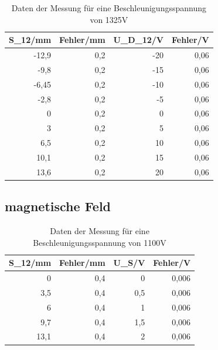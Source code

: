 \documentclass[12pt]{scrartcl}
\begin{document}
\begin{table}[htbp]
\caption{Daten der Messung für eine Beschleunigungsspannung von 1325V}
\begin{center}
\begin{tabular}{|r|r|r|r|}
\hline
\multicolumn{1}{|l|}{S\_12/mm} & \multicolumn{1}{l|}{Fehler/mm} & \multicolumn{1}{l|}{U\_D\_12/V} & \multicolumn{1}{l|}{Fehler/V} \\ \hline
-12,9 & 0,2 & -20 & 0,06 \\ \hline
-9,8 & 0,2 & -15 & 0,06 \\ \hline
-6,45 & 0,2 & -10 & 0,06 \\ \hline
-2,8 & 0,2 & -5 & 0,06 \\ \hline
0 & 0,2 & 0 & 0,06 \\ \hline
3 & 0,2 & 5 & 0,06 \\ \hline
6,5 & 0,2 & 10 & 0,06 \\ \hline
10,1 & 0,2 & 15 & 0,06 \\ \hline
13,6 & 0,2 & 20 & 0,06 \\ \hline
\end{tabular}
\end{center}
\label{tab:materialeigenschaften}
\end{table}

\newpage

\subsection{magnetische Feld}


\begin{table}[htbp]
\caption{Daten der Messung für eine Beschleunigungsspannung von 1100V}
\begin{center}
\begin{tabular}{|r|r|r|r|}
\hline
\multicolumn{1}{|l|}{S\_12/mm} & \multicolumn{1}{l|}{Fehler/mm} & \multicolumn{1}{l|}{U\_S/V} & \multicolumn{1}{l|}{Fehler/V} \\ \hline
0 & 0,4 & 0 & 0,006 \\ \hline
3,5 & 0,4 & 0,5 & 0,006 \\ \hline
6 & 0,4 & 1 & 0,006 \\ \hline
9,7 & 0,4 & 1,5 & 0,006 \\ \hline
13,1 & 0,4 & 2 & 0,006 \\ \hline
\end{tabular}
\end{center}
\label{tab:materialeigenschaften}
\end{table}
\end{document}
